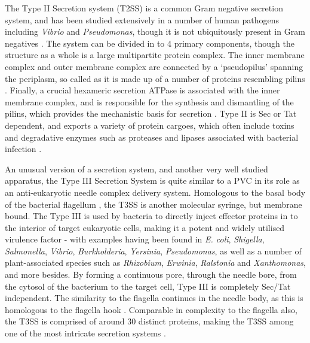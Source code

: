 The Type II Secretion system (T2SS) is a common Gram negative secretion system, and has been studied extensively in a number of human pathogens including \emph{Vibrio} and \emph{Pseudomonas}, though it is not ubiquitously present in Gram negatives \citep{Douzi2012}. The system can be divided in to 4 primary components, though the structure as a whole is a large multipartite protein complex. The inner membrane complex and outer membrane complex are connected by a `pseudopilus' spanning the periplasm, so called as it is made up of a number of proteins resembling pilins \citep{Korotkov2012}. Finally, a crucial hexameric secretion ATPase is associated with the inner membrane complex, and is responsible for the synthesis and dismantling of the pilins, which provides the mechanistic basis for secretion \citep{Lu2013}. Type II is Sec or Tat dependent, and exports a variety of protein cargoes, which often include toxins and degradative enzymes such as proteases and lipases associated with bacterial infection \citep{Korotkov2012}.

An unusual version of a secretion system, and another very well studied apparatus, the Type III Secretion System is quite similar to a PVC in its role as an anti-eukaryotic needle complex delivery system. Homologous to the basal body of the bacterial flagellum \citep{Aizawa2001}, the T3SS is another molecular syringe, but membrane bound. The Type III is used by bacteria to directly inject effector proteins in to the interior of target eukaryotic cells, making it a potent and widely utilised virulence factor \citep{AbuHatab1998} - with examples having been found in \emph{E. coli}, \emph{Shigella}, \emph{Salmonella}, \emph{Vibrio}, \emph{Burkholderia}, \emph{Yersinia}, \emph{Pseudomonas}, as well as a number of plant-associated species such as \emph{Rhizobium}, \emph{Erwinia}, \emph{Ralstonia} and \emph{Xanthomonas}, and more besides. By forming a continuous pore, through the needle bore, from the cytosol of the bacterium to the target cell, Type III is completely Sec/Tat independent. The similarity to the flagella continues in the needle body, as this is homologous to the flagella hook \citep{Lane2007}. Comparable in complexity to the flagella also, the T3SS is comprised of around 30 distinct proteins, making the T3SS among one of the most intricate secretion systems \citep{Green2015}.

